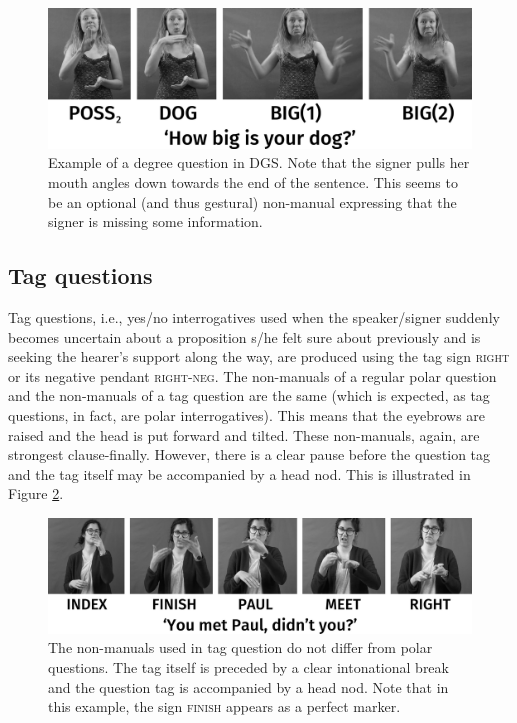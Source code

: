 \begin{figure}[bt]
\centering
	\includegraphics[width=1.0\textwidth]{millionalternativequestionssw.jpg}
	\caption{Example of a degree question in DGS. Note that the signer pulls her mouth angles down towards the end of the sentence. This seems to be an optional (and thus gestural) non-manual expressing that the signer is missing some information.  }
	\label{millionalternativequestions}
\end{figure}


\subsection{Tag questions}
Tag questions, i.e., yes/no interrogatives used when the speaker/signer suddenly becomes uncertain about a proposition s/he felt sure about previously and is seeking the hearer's support along the way, are produced using the tag sign \textsc{right} or its negative pendant \textsc{right-neg}. The non-manuals of a regular polar question and the non-manuals of a tag question are the same (which is expected, as tag questions, in fact, are polar interrogatives). This means that the eyebrows are raised and the head is put forward and tilted. These non-manuals, again, are strongest clause-finally. However, there is a clear pause before the question tag and the tag itself may be accompanied by a head nod. This is illustrated in Figure \ref{tagquestion}.

\begin{figure}[bt]
\centering
	\includegraphics[width=1.0\textwidth]{tagquestionsw.jpg}
	\caption{The non-manuals used in tag question do not differ from polar questions. The tag itself is preceded by a clear intonational break and the question tag is accompanied by a head nod. Note that in this example, the sign \textsc{finish} appears as a perfect marker.}
	\label{tagquestion}
\end{figure}

